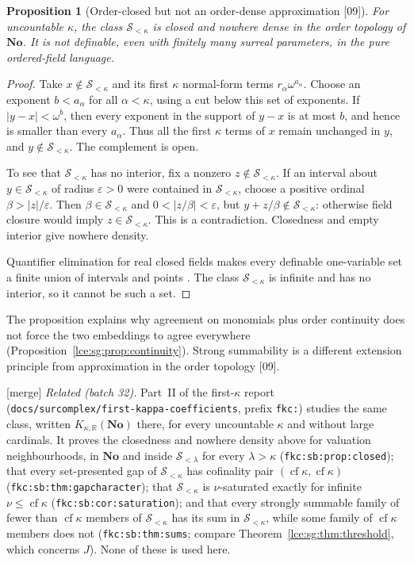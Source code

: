 \documentclass[11pt,letterpaper]{article}
\numberwithin{equation}{section}
\newtheorem{proposition}[theorem]{Proposition}
\theoremstyle{definition}
\theoremstyle{remark}
\newcommand{\No}{\mathbf{No}}
\newcommand{\R}{\mathbb R}
\newcommand{\Sk}{\mathscr S_{<\kappa}}
\newcommand{\eps}{\varepsilon}
\newcommand{\abs}[1]{\lvert#1\rvert}
\newcommand{\thref}[1]{Theorem~\ref{#1}}
\newcommand{\prref}[1]{Proposition~\ref{#1}}
\newcommand{\src}[1]{\textup{\textsf{\small[#1]}}}%
\newcommand{\mergetag}{\textup{\textsf{\small[merge]}}}%
\newcommand{\lbl}[1]{\nolinkurl{#1}}%
\newcommand{\fn}[1]{\nolinkurl{#1}}%
\newcommand{\cf}{\operatorname{cf}}
\begin{document}
\begin{proposition}[Order-closed but not an order-dense approximation \src{09}]
\label{lce:sg:prop:closed-support}
For uncountable $\kappa$, the class $\Sk$ is closed and nowhere dense in the
order topology of $\No$. It is not definable, even with finitely many
surreal parameters, in the pure ordered-field language.
\end{proposition}
\begin{proof}
Take $x\notin\Sk$ and its first $\kappa$ normal-form terms
$r_\alpha\omega^{a_\alpha}$. Choose an exponent $b<a_\alpha$ for all
$\alpha<\kappa$, using a cut below this set of exponents. If
$\abs{y-x}<\omega^b$, then every exponent in the support of $y-x$ is at most
$b$, and hence is smaller than every $a_\alpha$. Thus all the first $\kappa$
terms of $x$ remain unchanged in $y$, and $y\notin\Sk$. The complement is
open.

To see that $\Sk$ has no interior, fix a nonzero $z\notin\Sk$. If an
interval about $y\in\Sk$ of radius $\eps>0$ were contained in $\Sk$, choose a
positive ordinal $\beta>\abs z/\eps$. Then $\beta\in\Sk$ and
$0<\abs{z/\beta}<\eps$, but $y+z/\beta\notin\Sk$: otherwise field closure
would imply $z\in\Sk$. This is a contradiction. Closedness and empty
interior give nowhere density.

Quantifier elimination for real closed fields makes every definable
one-variable set a finite union of intervals and points \cite{Marker}. The
class $\Sk$ is infinite and has no interior, so it cannot be such a set.
\end{proof}
The proposition explains why agreement on monomials plus order continuity
does not force the two embeddings to agree everywhere
(\prref{lce:sg:prop:continuity}). Strong summability is a different
extension principle from approximation in the order topology \src{09}.

\mergetag{} \emph{Related (batch 32).} Part~II of the first-$\kappa$
report (\fn{docs/surcomplex/first-kappa-coefficients}, prefix
\lbl{fkc:}) studies the same class, written $K_{\kappa,\R}(\No)$ there, for
every uncountable $\kappa$ and without large cardinals. It proves the
closedness and nowhere density above for valuation neighbourhoods, in $\No$
and inside $\mathscr S_{<\lambda}$ for every $\lambda>\kappa$
(\lbl{fkc:sb:prop:closed}); that every set-presented gap of $\Sk$ has
cofinality pair $(\cf\kappa,\cf\kappa)$ (\lbl{fkc:sb:thm:gapcharacter});
that $\Sk$ is $\nu$-saturated exactly for infinite $\nu\le\cf\kappa$
(\lbl{fkc:sb:cor:saturation}); and that every strongly summable family of
fewer than $\cf\kappa$ members of $\Sk$ has its sum in $\Sk$, while some
family of $\cf\kappa$ members does not (\lbl{fkc:sb:thm:sums}; compare
\thref{lce:sg:thm:threshold}, which concerns $J$). None of these is used
here.
\end{document}

